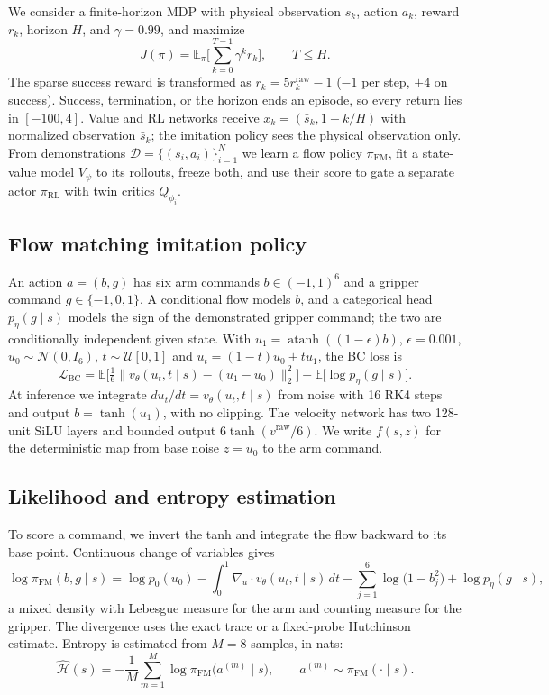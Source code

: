 \documentclass[10pt]{article}
\newcommand{\piFM}{\pi_{\mathrm{FM}}}
\newcommand{\piRL}{\pi_{\mathrm{RL}}}
\begin{document}
We consider a finite-horizon MDP with physical observation $s_k$, action $a_k$,
reward $r_k$, horizon $H$, and $\gamma=0.99$, and maximize
\begin{equation}
  J(\pi) = \mathbb{E}_\pi\Big[\sum_{k=0}^{T-1}\gamma^k r_k\Big], \qquad T\le H.
\end{equation}
The sparse success reward is transformed as $r_k=5r_k^{\mathrm{raw}}-1$ ($-1$
per step, $+4$ on success). Success, termination, or the horizon ends an
episode, so every return lies in $[-100,4]$. Value and RL networks receive
$x_k=(\bar s_k,1-k/H)$ with normalized observation $\bar s_k$; the imitation
policy sees the physical observation only. From demonstrations
$\mathcal{D}=\{(s_i,a_i)\}_{i=1}^N$ we learn a flow policy $\piFM$, fit a
state-value model $V_\psi$ to its rollouts, freeze both, and use their score to
gate a separate actor $\piRL$ with twin critics $Q_{\phi_i}$.

\subsection{Flow matching imitation policy}

An action $a=(b,g)$ has six arm commands $b\in(-1,1)^6$ and a gripper command
$g\in\{-1,0,1\}$. A conditional flow models $b$, and a categorical head
$p_\eta(g\mid s)$ models the sign of the demonstrated gripper command; the two
are conditionally independent given state. With
$u_1=\operatorname{atanh}((1-\epsilon)b)$, $\epsilon=0.001$,
$u_0\sim\mathcal{N}(0,I_6)$, $t\sim\mathcal{U}[0,1]$ and
$u_t=(1-t)u_0+tu_1$, the BC loss is
\begin{equation}
  \mathcal{L}_{\mathrm{BC}} =
  \mathbb{E}\Big[\tfrac{1}{6}\big\|v_\theta(u_t,t\mid s)-(u_1-u_0)\big\|_2^2\Big]
  - \mathbb{E}\big[\log p_\eta(g\mid s)\big].
\end{equation}
At inference we integrate $du_t/dt=v_\theta(u_t,t\mid s)$ from noise with 16
RK4 steps and output $b=\tanh(u_1)$, with no clipping. The velocity network has
two 128-unit SiLU layers and bounded output $6\tanh(v^{\mathrm{raw}}/6)$. We
write $f(s,z)$ for the deterministic map from base noise $z=u_0$ to the arm
command.

\subsection{Likelihood and entropy estimation}

To score a command, we invert the tanh and integrate the flow backward to its
base point. Continuous change of variables gives
\begin{equation}
  \log\piFM(b,g\mid s) = \log p_0(u_0)
  - \int_0^1 \nabla_u\!\cdot v_\theta(u_t,t\mid s)\,dt
  - \sum_{j=1}^{6}\log\big(1-b_j^2\big) + \log p_\eta(g\mid s),
\end{equation}
a mixed density with Lebesgue measure for the arm and counting measure for the
gripper. The divergence uses the exact trace or a fixed-probe Hutchinson
estimate. Entropy is estimated from $M=8$ samples, in nats:
\begin{equation}
  \hat{\mathcal{H}}(s) = -\frac{1}{M}\sum_{m=1}^{M}\log\piFM\big(a^{(m)}\mid s\big),
  \qquad a^{(m)}\sim\piFM(\cdot\mid s).
\end{equation}
\end{document}
